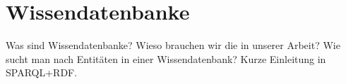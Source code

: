 
\section{Wissendatenbanke}
Was sind Wissendatenbanke? Wieso brauchen wir die in unserer Arbeit? Wie sucht man nach Entitäten in einer Wissendatenbank? Kurze Einleitung in SPARQL+RDF.
\paragraph{}

\paragraph{}
%

